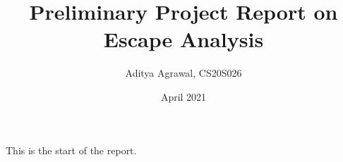 \documentclass{article}
\title{Preliminary Project Report on Escape Analysis}
\author{Aditya Agrawal, CS20S026}
\date{April 2021}
\begin{document}
\maketitle
This is the start of the report.
\end{document}
